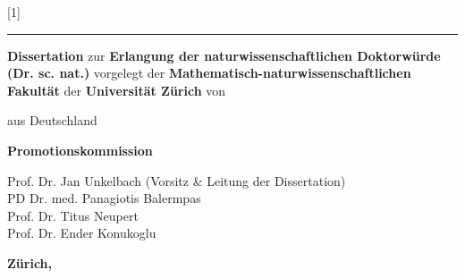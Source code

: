 \documentclass[\relativeRoot/main.tex]{subfiles}
\begin{document}
    \begin{titlepage}
        \begin{center}
            \scalebox{0.78}[1]{\begin{minipage}{1.27\textwidth}
                \centering
                \LARGE
                \MakeUppercase{\thetitle}
            \end{minipage} }
            \vspace{1.5mm}

            \rule{2cm}{0.5pt}
            \vspace{2cm}

            \textbf{Dissertation} \vfill
            zur \vfill
            \textbf{Erlangung der naturwissenschaftlichen Doktorwürde} \\
            \textbf{(Dr. sc. nat.)} \vfill
            vorgelegt der \vfill
            \textbf{Mathematisch-naturwissenschaftlichen Fakultät} \vfill
            der \vfill
            \textbf{Universität Zürich} \vfill
            von
            
            \vspace{2cm}

            {\large\sc \theauthor} \vfill
            aus \vfill
            {\large\sc Deutschland}
            
            \vspace{2cm}
            
            \textbf{Promotionskommission} \vfill
            \hspace{0.15\textwidth} \begin{minipage}{0.75\textwidth}
                Prof. Dr. Jan Unkelbach {\small (Vorsitz \& Leitung der Dissertation)}\\
                PD Dr. med. Panagiotis Balermpas\\
                Prof. Dr. Titus Neupert\\
                Prof. Dr. Ender Konukoglu
            \end{minipage} 

            \vspace{1cm}
            \textbf{Zürich, \thedate}
                
        \end{center}
    \end{titlepage}
\end{document}
